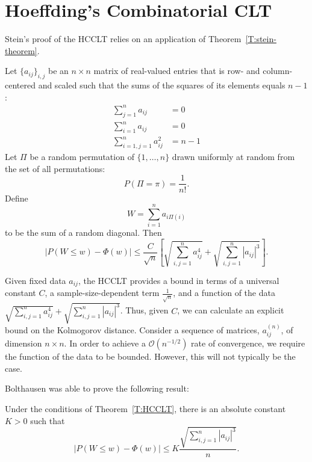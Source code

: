 \section{Hoeffding's Combinatorial CLT}
Stein's proof of the HCCLT relies on an application of Theorem~\ref{T:stein-theorem}.
\begin{theorem}\label{T:HCCLT}
  Let $\{a_{ij}\}_{i,j}$ be an $n \times n$ matrix of real-valued
  entries that is row- and column-centered and scaled such that the sums
  of the squares of its elements equals $n-1$:
  \begin{align*}
    \sum_{j=1}^n a_{ij} &= 0 \\
    \sum_{i=1}^n a_{ij} &= 0 \\
    \sum_{i=1, j=1}^n a_{ij}^2 &= n-1
  \end{align*}
  Let $\Pi$ be a random permutation of $\{1, \ldots, n\}$ drawn
  uniformly at random from the set of all permutations:
  \begin{equation*}
    P(\Pi = \pi) = \frac{1}{n!}.
  \end{equation*}
  Define
  \begin{equation*}
    W = \sum_{i=1}^n a_{i\Pi(i)}
  \end{equation*}
  to be the sum of a random diagonal.  Then
  \begin{equation*}
    |P(W \leq w) - \Phi(w)| \leq
    \frac{C}{\sqrt{n}} \left [
      \sqrt{\sum_{i, j = 1}^{n} a_{ij}^4} +
      \sqrt{\sum_{i, j = 1}^{n} |a_{ij}|^3}
    \right ].
  \end{equation*}
\end{theorem}

Given fixed data $a_{ij}$, the HCCLT provides a bound in terms of a
universal constant $C$, a sample-size-dependent term
$\frac{1}{\sqrt{n}}$, and a function of the data $\sqrt{\sum_{i, j =
1}^{n} a_{ij}^4} + \sqrt{\sum_{i, j = 1}^{n} |a_{ij}|^3}$.  Thus,
given $C$, we can calculate an explicit bound on the Kolmogorov
distance.  Consider a sequence of matrices, $a_{ij}^{(n)}$, of
dimension $n \times n$.  In order to achieve a $\mathcal{O}(n^{-1/2})$
rate of convergence, we require the function of the data to be
bounded.  However, this will not typically be the case.

Bolthausen \cite{bolthausen1984estimate} was able to prove the following result:
\begin{theorem}[Bolthausen]
  Under the conditions of Theorem~\ref{T:HCCLT}, there is an absolute constant
  $K > 0$ such that
  \begin{equation*}
    |P(W \leq w) - \Phi(w)| \leq K \frac{\sqrt{\sum_{i, j = 1}^{n} |a_{ij}|^3}}{n}.
  \end{equation*}
\end{theorem}

